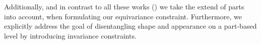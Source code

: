 	Additionally, and in contrast to all these works (\cite{thewlis17, zhang18, jakab18}) we take the extend of parts into account, when formulating our equivariance constraint. Furthermore, we explicitly address the goal of disentangling shape and appearance on a part-based level by introducing invariance constraints.

